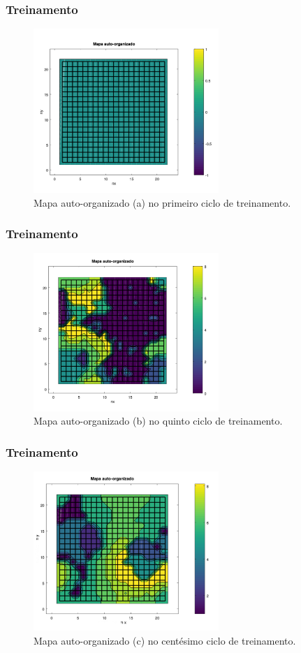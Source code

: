 \documentclass[10pt]{beamer} %
\begin{document}
\begin{frame}
	\frametitle{Treinamento}
	\begin{figure}
		\centering
		\includegraphics[width=7.0cm]{Imagens/SOM1_2d.pdf}
		\caption{Mapa auto-organizado (a) no primeiro ciclo de treinamento.}
	\end{figure}
\end{frame}

\begin{frame}
	\frametitle{Treinamento}
	\begin{figure}
		\centering
		\includegraphics[width=7.0cm]{Imagens/SOM5_2d.pdf}
		\caption{Mapa auto-organizado (b) no quinto ciclo de treinamento.}
	\end{figure}
\end{frame}

\begin{frame}
	\frametitle{Treinamento}
	\begin{figure}
		\centering
		\includegraphics[width=7.0cm]{Imagens/SOM100_2d.pdf}
		\caption{Mapa auto-organizado (c) no centésimo ciclo de treinamento.}
	\end{figure}
\end{frame}
\end{document}
